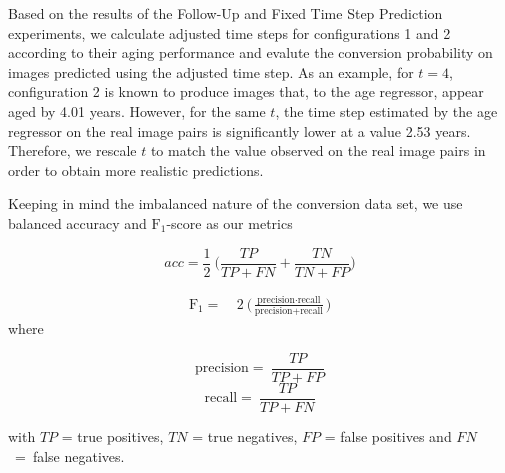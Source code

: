 Based on the results of the Follow-Up and Fixed Time Step Prediction experiments, we calculate adjusted time steps for configurations 1 and 2 according to their aging performance and evalute the conversion probability on images predicted using the adjusted time step. As an example, for $t = 4$, configuration 2 is known to produce images that, to the age regressor, appear aged by 4.01 years. However, for the same $t$, the time step estimated by the age regressor on the real image pairs is significantly lower at a value 2.53 years. Therefore, we rescale $t$ to match the value observed on the real image pairs in order to obtain more realistic predictions.

Keeping in mind the imbalanced nature of the conversion data set, we use balanced accuracy and $\text{F}_1$-score as our metrics

\begin{equation}
	acc = \frac{1}{2}\ \bigg(\frac{TP}{TP + FN} + \frac{TN}{TN + FP}\bigg)
\end{equation}

\begin{equation}
	\begin{split}
		\text{F}_1 =&\ 2\ \bigg(\frac{\text{precision} \cdot \text{recall}}{\text{precision} + \text{recall}}\bigg)
	\end{split}
\end{equation}
where
\begin{center}
	\vspace{-40pt}
	\parbox{0.7\linewidth}{
		\begin{multicols}{2}
			\begin{equation*}
				\text{precision} = \ \frac{TP}{TP + FP}
			\end{equation*}\break
			\begin{equation*}
				\text{recall} = \ \frac{TP}{TP + FN}
			\end{equation*}
		\end{multicols}
	}
\end{center}

with $TP$ = true positives, $TN$ = true negatives, $FP$ = false positives and $FN$~=~false negatives.

